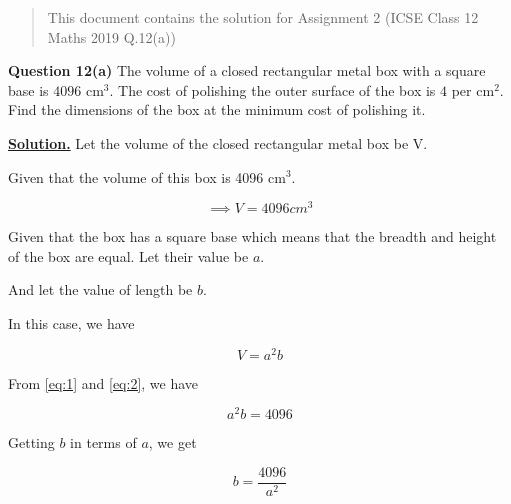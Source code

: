 \documentclass[journal,12pt,twocolumn]{IEEEtran}
\begin{document}
\begin{abstract}
This document contains the solution for Assignment 2 (ICSE Class 12 Maths 2019 Q.12(a))
\end{abstract}











	\maketitle
	
	\textbf{Question 12(a)} 
	 The volume of a closed rectangular metal box with a square base is $4096$ cm$^3$. The cost of polishing the outer surface of the box is \rupee $4$ per cm$^2$. Find the dimensions of the box at the minimum cost of polishing it.
	 
	\textbf{\underline{Solution.}} Let the volume of the closed rectangular metal box be V.
	
	Given that the volume of this box is 4096 cm$^3$.
	
	
	 \begin{equation}
	 \label{eq:1}{\implies}V = 4096 cm^3   
	 \end{equation} 
	 
	 Given that the box has a square base which means that the breadth and height of the box are equal. Let their value be $a$.
	 
	 And let the value of length be $b$.
	 
	 In this case, we have
	 
	 
	 \begin{equation}
	   \label{eq:2}V=a^2b
	 \end{equation}
	 
	 From \eqref{eq:1} and \eqref{eq:2}, we have
	 
	 \begin{equation}
	    a^2b=4096
	 \end{equation}
	 
	 Getting $b$ in terms of $a$, we get
	 
	 \begin{equation}
	    \label{eq:4} b = \dfrac{4096}{a^2}
	 \end{equation}
	 
\end{document}
